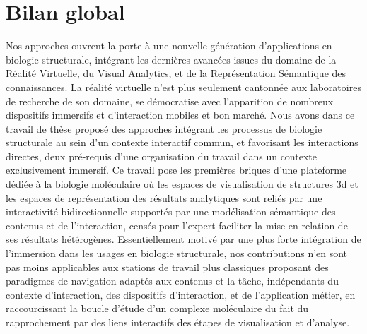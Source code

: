 \section*{Bilan global}

Nos approches ouvrent la porte à une nouvelle génération d'applications en biologie structurale, intégrant les dernières avancées issues du domaine de la Réalité Virtuelle, du Visual Analytics, et de la Représentation Sémantique des connaissances. La réalité virtuelle n'est plus seulement cantonnée aux laboratoires de recherche de son domaine, se démocratise avec l'apparition de nombreux dispositifs immersifs et d'interaction mobiles et bon marché. Nous avons dans ce travail de thèse proposé des approches intégrant les processus de biologie structurale au sein d'un contexte interactif commun, et favorisant les interactions directes, deux pré-requis d'une organisation du travail dans un contexte exclusivement immersif. Ce travail pose les premières briques d'une plateforme dédiée à la biologie moléculaire où les espaces de visualisation de structures 3d et les espaces de représentation des résultats analytiques sont reliés par une interactivité bidirectionnelle supportés par une modélisation sémantique des contenus et de l'interaction, censés pour l'expert faciliter la mise en relation de ses résultats hétérogènes. Essentiellement motivé par une plus forte intégration de l'immersion dans les usages en biologie structurale, nos contributions n'en sont pas moins applicables aux stations de travail plus classiques proposant des paradigmes de navigation adaptés aux contenus et la tâche, indépendants du contexte d'interaction, des dispositifs d'interaction, et de l'application  métier, en raccourcissant la boucle d'étude d'un complexe moléculaire du fait du rapprochement par des liens interactifs des étapes de visualisation et d'analyse.

